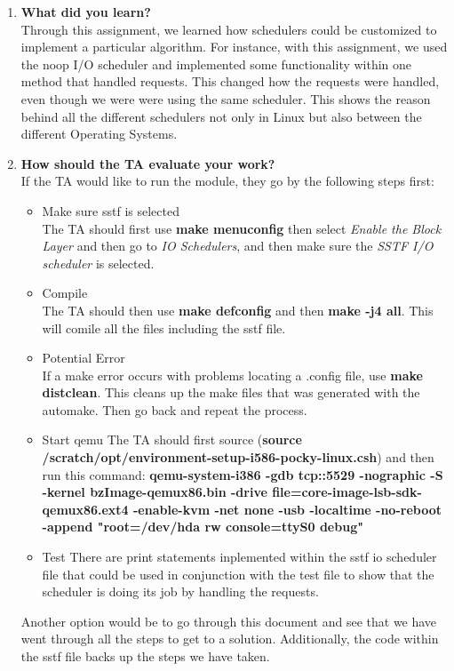 \documentclass[10pt, onecolumn, letterpaper, draftclsnofoot]{IEEEtran}
\begin{document}
\begin{enumerate}
\item{\textbf{What did you learn?}}\\
Through this assignment, we learned how schedulers could be customized to implement a particular algorithm. For instance, with this assignment, we used the noop I/O scheduler and implemented some functionality within one method that handled requests. This changed how the requests were handled, even though we were were using the same scheduler. This shows the reason behind all the different schedulers not only in Linux but also between the different Operating Systems. 

\item{\textbf{How should the TA evaluate your work?}}\\
If the TA would like to run the module, they go by the following steps first: 
\begin{itemize}

\item {Make sure sstf is selected} \\
The TA should first use \textbf {make menuconfig} then select \textit{Enable the Block Layer} and then go to \textit{IO Schedulers}, and then make sure the \textit{SSTF I/O scheduler} is selected.

\item {Compile} \\
The TA should then use \textbf{make defconfig} and then \textbf{make -j4 all}. This will comile all the files including the sstf file. 

\item {Potential Error} \\
If a make error occurs with problems locating a .config file, use \textbf{make distclean}. This cleans up the make files that was generated with the automake. Then go back and repeat the process. 

\item {Start qemu}
The TA should first source (\textbf{source /scratch/opt/environment-setup-i586-pocky-linux.csh}) and then run this command: \textbf{qemu-system-i386 -gdb tcp::5529 -nographic -S -kernel bzImage-qemux86.bin -drive file=core-image-lsb-sdk-qemux86.ext4 -enable-kvm -net none -usb -localtime -no-reboot -append "root=/dev/hda rw console=ttyS0 debug"}

\item {Test}
There are print statements inplemented within the sstf io scheduler file that could be used in conjunction with the test file to show that the scheduler is doing its job by handling the requests. 

\end{itemize}

Another option would be to go through this document and see that we have went through all the steps to get to a solution. Additionally, the code within the sstf file backs up the steps we have taken. 

\end{enumerate}
\end{document}
